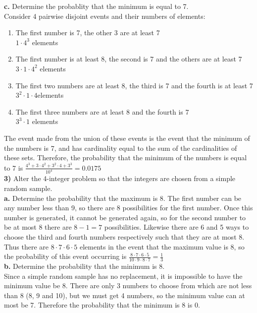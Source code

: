 \documentclass{scrartcl}
\begin{document}
\textbf{c.} Determine the probablity that the minimum is equal to 7.\\
Consider 4 pairwise disjoint events and their numbers of elements:
\begin{enumerate}
  \item The first number is 7, the other 3 are at least 7 \\ $1\cdot4^3$ elements
  \item The first number is at least 8, the second is 7 and the others are at least 7 \\ $3\cdot1\cdot4^2$ elements
  \item The first two numbers are at least 8, the third is 7 and the fourth is at least 7 \\ $3^2\cdot1\cdot4$elements
  \item The first three numbers are at least 8 and the fourth is 7 \\ $3^3\cdot1$ elements
\end{enumerate}
The event made from the union of these events is the event that the minimum of the numbers is 7, and has cardinality equal to the sum of the cardinalities of these sets. Therefore, the probability that the minimum of the numbers is equal to 7 is $\frac{4^3+3\cdot4^2+3^2\cdot4+3^3}{10^4}=0.0175$\\

\textbf{3)} Alter the 4-integer problem so that the integers are chosen from a simple random sample.\\

\textbf{a.} Determine the probability that the maximum is 8.
The first number can be any number less than 9, so there are 8 possibilities for the first number. Once this number is generated, it cannot be generated again, so for the second number to be at most 8 there are $8-1=7$ possibilities. Likewise there are 6 and 5 ways to choose the third and fourth numbers respectively such that they are at most 8. Thus there are $8\cdot7\cdot6\cdot5$ elements in the event that the maximum value is 8, so the probability of this event occurring is $\frac{8\cdot7\cdot6\cdot5}{10\cdot9\cdot8\cdot7}=\frac{1}{3}$\\

\textbf{b.} Determine the probability that the minimum is 8.\\
Since a simple random sample has no replacement, it is impossible to have the minimum value be 8. There are only 3 numbers to choose from which are not less than 8 (8, 9 and 10), but we must get 4 numbers, so the minimum value can at most be 7. Therefore the probability that the minimum is 8 is 0.
\end{document}
